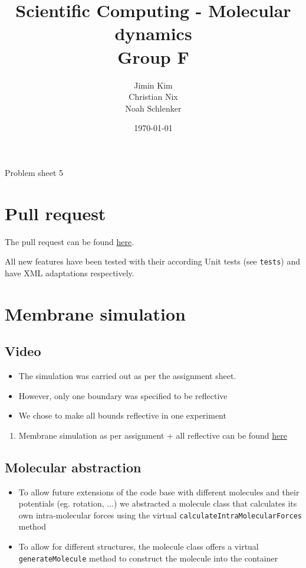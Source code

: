 \documentclass{article}
\title{Scientific Computing - Molecular dynamics \\ Group F}
\author{
    Jimin Kim \\
    Christian Nix \\
    Noah Schlenker
}
\date{\today}
\newcommand{\subtitle}{Problem sheet 5}
\begin{document}
\maketitle

\begin{center}
    \LARGE \subtitle{}
\end{center}

\section{Pull request}
\label{sec:pr}
The pull request can be found \href{https://github.com/noahpy/MolSim-SS24/pull/60}{here}.

All new features have been tested with their according Unit tests (see \texttt{tests}) and have XML adaptations respectively.

\section{Membrane simulation}
\label{sec:mem}

    \subsection{Video}
    \label{sec:mem:video}
    \begin{itemize}
        \item The simulation was carried out as per the assignment sheet.
        \item However, only one boundary was specified to be reflective
        \item We chose to make all bounds reflective in one experiment
    \end{itemize}

    \begin{enumerate}
        \item Membrane simulation as per assignment + all reflective can be found \href{https://youtu.be/FDe_RSdYlXM}{here}
    \end{enumerate}

    \subsection{Molecular abstraction}
    \label{sec:mem:mol}
        \begin{itemize}
            \item To allow future extensions of the code base with different molecules and their potentials (eg. rotation, ...) we abstracted a molecule class that calculates its own intra-molecular forces using the virtual \texttt{calculateIntraMolecularForces} method
            \item To allow for different structures, the molecule class offers a virtual \texttt{generateMolecule} method to construct the molecule into the container
        \end{itemize}
\end{document}
